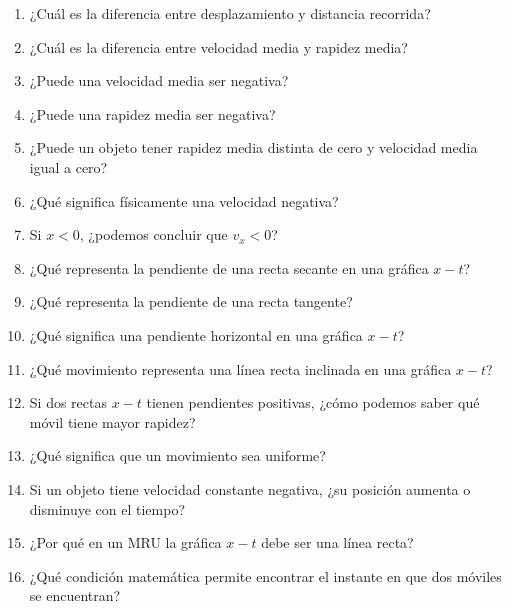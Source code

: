 \begin{enumerate}

    \item ¿Cuál es la diferencia entre desplazamiento y distancia recorrida?

    \item ¿Cuál es la diferencia entre velocidad media y rapidez media?

    \item ¿Puede una velocidad media ser negativa?

    \item ¿Puede una rapidez media ser negativa?

    \item ¿Puede un objeto tener rapidez media distinta de cero y velocidad
    media igual a cero?

    \item ¿Qué significa físicamente una velocidad negativa?

    \item Si \(x<0\), ¿podemos concluir que \(v_x<0\)?

    \item ¿Qué representa la pendiente de una recta secante en una gráfica
    \(x-t\)?

    \item ¿Qué representa la pendiente de una recta tangente?

    \item ¿Qué significa una pendiente horizontal en una gráfica \(x-t\)?

    \item ¿Qué movimiento representa una línea recta inclinada en una gráfica
    \(x-t\)?

    \item Si dos rectas \(x-t\) tienen pendientes positivas, ¿cómo podemos
    saber qué móvil tiene mayor rapidez?

    \item ¿Qué significa que un movimiento sea uniforme?

    \item Si un objeto tiene velocidad constante negativa, ¿su posición
    aumenta o disminuye con el tiempo?

    \item ¿Por qué en un MRU la gráfica \(x-t\) debe ser una línea recta?

    \item ¿Qué condición matemática permite encontrar el instante en que dos
    móviles se encuentran?

\end{enumerate}


